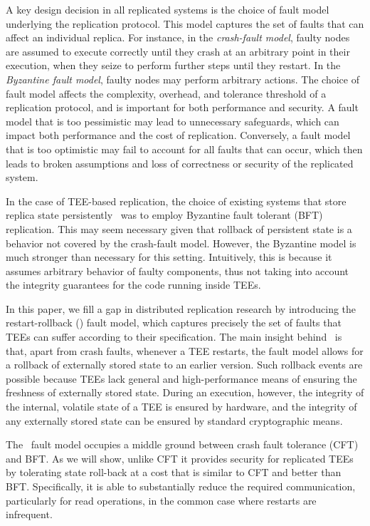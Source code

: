 A key design decision in all replicated systems is the choice of fault
model underlying the replication protocol. This model captures the set
of faults that can affect an individual replica.  For instance, in the
{\em crash-fault model}, faulty nodes are assumed to execute correctly
until they crash at an arbitrary point in their execution, when they
seize to perform further steps until they restart. In the {\em
  Byzantine fault model}, faulty nodes may perform arbitrary
actions. The choice of fault model affects the complexity, overhead,
and tolerance threshold of a replication protocol, and is important
for both performance and security. A fault model that is too
pessimistic may lead to unnecessary safeguards, which can impact both
performance and the cost of replication. Conversely, a fault model
that is too optimistic may fail to account for all faults that can
occur, which then leads to broken assumptions and loss of correctness
or security of the replicated system.

In the case of \ac{TEE}-based replication, the choice of existing systems
that store replica state persistently~\cite{teechain,rote} was to
employ Byzantine fault tolerant (BFT) replication. This may seem
necessary given that rollback of persistent state is a behavior not
covered by the crash-fault model.  However, the Byzantine model is
much stronger than necessary for this setting. Intuitively, this
is because it assumes arbitrary behavior of
faulty components, thus not taking into account the integrity
guarantees for the code running inside \acp{TEE}.

In this paper, we fill a gap in distributed replication research by
introducing the restart-rollback (\faultmodel) fault model, which
captures precisely the set of faults that \acp{TEE} can suffer according to
their specification.  The main insight behind \faultmodel\ is that,
apart from crash faults, whenever a \ac{TEE} restarts, the fault model
allows for a rollback of externally stored state to an earlier
version.  Such rollback events are possible because \acp{TEE} lack general
and high-performance means of ensuring the freshness of externally
stored state.  During an execution, however, the integrity of the
internal, volatile state of a \ac{TEE} is ensured by hardware, and the
integrity of any externally stored state can be ensured by standard
cryptographic means.

The \faultmodel\ fault model occupies a middle ground between crash
fault tolerance (CFT) and BFT. As we will show, unlike CFT it provides
security for replicated \acp{TEE} by tolerating state roll-back at a cost
that is similar to CFT and better than BFT. Specifically, it is able
to substantially reduce the required communication, particularly for
read operations, in the common case where restarts are
infrequent.

